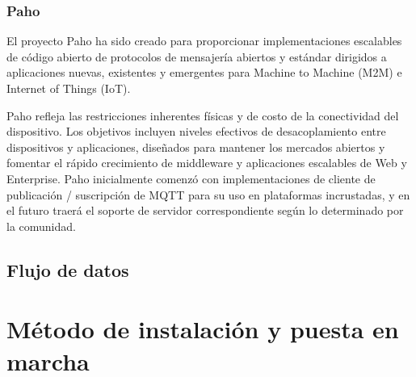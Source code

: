 		\subsubsection{Paho}
		El proyecto Paho ha sido creado para proporcionar implementaciones escalables de código abierto de protocolos de mensajería abiertos y estándar dirigidos a aplicaciones nuevas, existentes y emergentes para Machine to Machine (M2M) e Internet of Things (IoT).
		
		Paho refleja las restricciones inherentes físicas y de costo de la conectividad del dispositivo. Los objetivos incluyen niveles efectivos de desacoplamiento entre dispositivos y aplicaciones, diseñados para mantener los mercados abiertos y fomentar el rápido crecimiento de middleware y aplicaciones escalables de Web y Enterprise. Paho inicialmente comenzó con implementaciones de cliente de publicación / suscripción de MQTT para su uso en plataformas incrustadas, y en el futuro traerá el soporte de servidor correspondiente según lo determinado por la comunidad.
		
	\subsection{Flujo de datos}

\section{Método de instalación y puesta en marcha}
\label{makereference4.4}